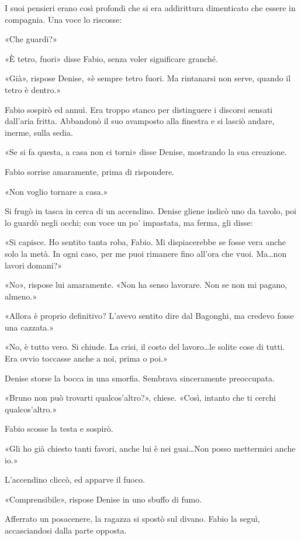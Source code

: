 I suoi pensieri erano così profondi che si era addirittura dimenticato che essere in compagnia. Una voce lo riscosse:

«Che guardi?»

«È tetro, fuori» disse Fabio, senza voler significare granché.

«Già», rispose Denise, «è sempre tetro fuori. Ma rintanarsi non serve, quando il tetro è dentro.»

Fabio sospirò ed annuì. Era troppo stanco per distinguere i discorsi sensati dall'aria fritta. Abbandonò il suo avamposto alla finestra e si lasciò andare, inerme, sulla sedia.

«Se si fa questa, a casa non ci torni» disse Denise, mostrando la sua creazione.

Fabio sorrise amaramente, prima di rispondere.

«Non voglio tornare a casa.»

Si frugò in tasca in cerca di un accendino. Denise gliene indicò uno da tavolo, poi lo guardò negli occhi; con voce un po' impastata, ma ferma, gli disse:

«Si capisce. Ho sentito tanta roba, Fabio. Mi dispiacerebbe se fosse vera anche solo la metà. In ogni caso, per me puoi rimanere fino all'ora che vuoi. Ma\ldots \space non lavori domani?»

«No», rispose lui amaramente. «Non ha senso lavorare. Non se non mi pagano, almeno.»

«Allora è proprio definitivo? L'avevo sentito dire dal Bagonghi, ma credevo fosse una cazzata.»

«No, è tutto vero. Si chiude. La crisi, il costo del lavoro\ldots \space le solite cose di tutti. Era ovvio toccasse anche a noi, prima o poi.»

Denise storse la bocca in una smorfia. Sembrava sinceramente preoccupata.

«Bruno non può trovarti qualcos'altro?», chiese. «Così, intanto che ti cerchi qualcos'altro.»

Fabio scosse la testa e sospirò.

«Gli ho già chiesto tanti favori, anche lui è nei guai\ldots \space Non posso mettermici anche io.»

L'accendino cliccò, ed apparve il fuoco.

«Comprensibile», rispose Denise in uno sbuffo di fumo.

Afferrato un posacenere, la ragazza si spostò sul divano. Fabio la seguì, accasciandosi dalla parte opposta.

